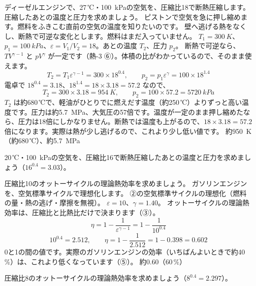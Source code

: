 \label{ph:熱-7:ex1}
\begin{phreidai}
ディーゼルエンジンで、27\,℃・\qty{100}{kPa}の空気を、圧縮比18で断熱圧縮します。圧縮したあとの温度と圧力を求めましょう。
\phbamen
ピストンで空気を急に押し縮めます。燃料をふきこむ直前の空気の温度を知りたいのです。
\phmushi
壁へ逃げる熱をなくし、断熱で可逆な変化とします。燃料はまだ入っていません。
\phzu
$T_1=\qty{300}{K}$、$p_1=\qty{100}{kPa}$、$\varepsilon=V_1/V_2=18$。あとの温度 $T_2$、圧力 $p_2$。
\phriyu
断熱で可逆なら、$TV^{\gamma-1}$ と $pV^{\gamma}$ が一定です（熱-3 ⑥）。体積の比がわかっているので、そのまま使えます。
\phtateru
\[T_2=T_1\varepsilon^{\gamma-1}=300\times18^{0.4},\qquad p_2=p_1\varepsilon^{\gamma}=100\times18^{1.4}\]
\phtoku
電卓で $18^{0.4}=3.18$、$18^{1.4}=18\times3.18=57.2$ なので、
\[T_2=300\times3.18=\qty{954}{K},\qquad p_2=100\times57.2=\qty{5720}{kPa}\]
\phtashikame
$T_2$ は約680\,℃で、軽油がひとりでに燃えだす温度（約250\,℃）よりずっと高い温度です。圧力は約\qty{5.7}{MPa}、大気圧の57倍です。温度が一定のまま押し縮めたなら、圧力は18倍にしかなりません。断熱では温度も上がるので、$18\times3.18=57.2$ 倍になります。実際は熱が少し逃げるので、これより少し低い値です。
\kotae 約\qty{950}{K}（約680\,℃）、約\qty{5.7}{MPa}
\end{phreidai}
\begin{jibun}
20\,℃・\qty{100}{kPa}の空気を、圧縮比16で断熱圧縮したあとの温度と圧力を求めましょう（$16^{0.4}=3.03$）。
\end{jibun}

\label{ph:熱-7:ex2}
\begin{phreidai}[ガソリンエンジンの理論熱効率]
圧縮比10のオットーサイクルの理論熱効率を求めましょう。
\phbamen
ガソリンエンジンを、空気標準サイクルで理想化します。
\phmushi
②の空気標準サイクルの理想化（燃料の量・熱の逃げ・摩擦を無視）。
\phzu
$\varepsilon=10$、$\gamma=1.40$。
\phriyu
オットーサイクルの理論熱効率は、圧縮比と比熱比だけで決まります（③）。
\phtateru
\[\eta=1-\frac{1}{\varepsilon^{\gamma-1}}=1-\frac{1}{10^{0.4}}\]
\phtoku
\[10^{0.4}=2.512,\qquad\eta=1-\frac{1}{2.512}=1-0.398=0.602\]
\phtashikame
0と1の間の値です。実際のガソリンエンジンの効率（いちばんよいときで約40\,\%）は、これより低くなっています（⑤）。
\kotae 約0.60（60\,\%）
\end{phreidai}
\begin{jibun}
圧縮比8のオットーサイクルの理論熱効率を求めましょう（$8^{0.4}=2.297$）。
\end{jibun}

